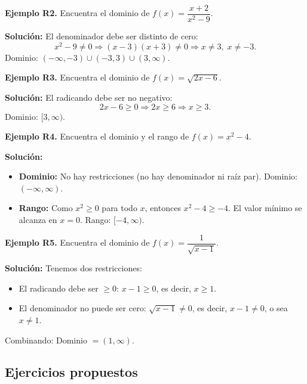 \documentclass[12pt, letterpaper]{article}
\begin{document}
\textbf{Ejemplo R2.} Encuentra el dominio de $f(x) = \dfrac{x + 2}{x^2 - 9}$.

\begin{cuadrosolucion}
  \textbf{Solución:} El denominador debe ser distinto de cero:
  $$x^2 - 9 \neq 0 \Rightarrow (x - 3)(x + 3) \neq 0 \Rightarrow x \neq 3,\; x \neq -3.$$
  Dominio: $(-\infty, -3) \cup (-3, 3) \cup (3, \infty)$.
\end{cuadrosolucion}

\textbf{Ejemplo R3.} Encuentra el dominio de $f(x) = \sqrt{2x - 6}$.

\begin{cuadrosolucion}
  \textbf{Solución:} El radicando debe ser no negativo:
  $$2x - 6 \geq 0 \Rightarrow 2x \geq 6 \Rightarrow x \geq 3.$$
  Dominio: $[3, \infty)$.
\end{cuadrosolucion}

\textbf{Ejemplo R4.} Encuentra el dominio y el rango de $f(x) = x^2 - 4$.

\begin{cuadrosolucion}
  \textbf{Solución:}
  \begin{itemize}
    \item \textbf{Dominio:} No hay restricciones (no hay denominador ni raíz par). Dominio: $(-\infty, \infty)$.
    \item \textbf{Rango:} Como $x^2 \geq 0$ para todo $x$, entonces $x^2 - 4 \geq -4$. El valor mínimo se alcanza en $x = 0$. Rango: $[-4, \infty)$.
  \end{itemize}
\end{cuadrosolucion}

\textbf{Ejemplo R5.} Encuentra el dominio de $f(x) = \dfrac{1}{\sqrt{x - 1}}$.

\begin{cuadrosolucion}
  \textbf{Solución:} Tenemos dos restricciones:
  \begin{itemize}
    \item El radicando debe ser $\geq 0$: $x - 1 \geq 0$, es decir, $x \geq 1$.
    \item El denominador no puede ser cero: $\sqrt{x - 1} \neq 0$, es decir, $x - 1 \neq 0$, o sea $x \neq 1$.
  \end{itemize}
  Combinando: Dominio $= (1, \infty)$.
\end{cuadrosolucion}

\newpage

\subsection{Ejercicios propuestos}
\end{document}

